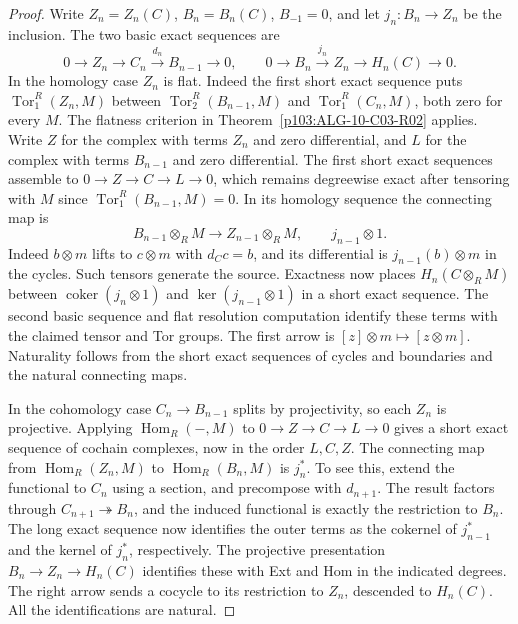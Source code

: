 \documentclass[11pt,oneside,openany]{book}
\theoremstyle{definition}
\theoremstyle{remark}
\begin{document}
\begin{proof}
Write \(Z_n=Z_n(C)\), \(B_n=B_n(C)\), \(B_{-1}=0\), and let
\(j_n:B_n\to Z_n\) be the inclusion. The two basic exact
sequences are
\[
 0\to Z_n\to C_n\xrightarrow{d_n}B_{n-1}\to0,
 \qquad
 0\to B_n\xrightarrow{j_n}Z_n\to H_n(C)\to0 .
\]
In the homology case \(Z_n\) is flat. Indeed the first short
exact sequence puts \(\operatorname{Tor}_1^R(Z_n,M)\) between
\(\operatorname{Tor}_2^R(B_{n-1},M)\) and
\(\operatorname{Tor}_1^R(C_n,M)\), both zero for every \(M\).
The flatness criterion in
Theorem~\ref{p103:ALG-10-C03-R02} applies.
Write \(Z\) for the complex with terms \(Z_n\) and zero
differential, and \(L\) for the complex with terms \(B_{n-1}\)
and zero differential. The first short exact sequences assemble to
\(0\to Z\to C\to L\to0\), which remains degreewise exact after
tensoring with \(M\) since \(\operatorname{Tor}_1^R(B_{n-1},M)=0\).
In its homology sequence the connecting map is
\[
 B_{n-1}\otimes_R M\longrightarrow Z_{n-1}\otimes_R M,
 \qquad j_{n-1}\otimes1 .
\]
Indeed \(b\otimes m\) lifts to \(c\otimes m\) with \(d_C c=b\),
and its differential is \(j_{n-1}(b)\otimes m\) in the cycles.
Such tensors generate the source. Exactness now places
\(H_n(C\otimes_R M)\) between
\(\operatorname{coker}(j_n\otimes1)\) and
\(\ker(j_{n-1}\otimes1)\) in a short exact sequence.
The second basic sequence and flat resolution computation
identify these terms with the claimed tensor and Tor groups.
The first arrow is \([z]\otimes m\mapsto[z\otimes m]\).
Naturality follows from the short exact sequences of cycles and
boundaries and the natural connecting maps.

In the cohomology case \(C_n\to B_{n-1}\) splits by projectivity,
so each \(Z_n\) is projective. Applying \(\operatorname{Hom}_R(-,M)\)
to \(0\to Z\to C\to L\to0\) gives a short exact sequence of
cochain complexes, now in the order \(L,C,Z\).
The connecting map from \(\operatorname{Hom}_R(Z_n,M)\) to
\(\operatorname{Hom}_R(B_n,M)\) is \(j_n^*\). To see this,
extend the functional to \(C_n\) using a section, and
precompose with \(d_{n+1}\). The result factors through
\(C_{n+1}\twoheadrightarrow B_n\), and the induced functional
is exactly the restriction to \(B_n\). The long exact sequence
now identifies the outer terms as the cokernel of \(j_{n-1}^*\)
and the kernel of \(j_n^*\), respectively. The projective
presentation \(B_n\to Z_n\to H_n(C)\) identifies these with Ext
and Hom in the indicated degrees. The right arrow sends a
cocycle to its restriction to \(Z_n\), descended to \(H_n(C)\).
All the identifications are natural.


\end{proof}
\end{document}
